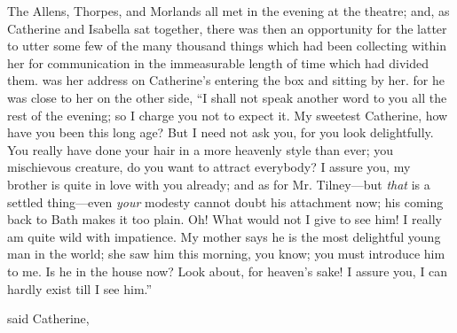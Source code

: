 The Allens, Thorpes, and Morlands all met in the evening at the theatre; and, as Catherine and Isabella sat together, there was then an opportunity for the latter to utter some few of the many thousand things which had been collecting within her for communication in the immeasurable length of time which had divided them.  was her address on Catherine's entering the box and sitting by her.  for he was close to her on the other side, “I shall not speak another word to you all the rest of the evening; so I charge you not to expect it. My sweetest Catherine, how have you been this long age? But I need not ask you, for you look delightfully. You really have done your hair in a more heavenly style than ever; you mischievous creature, do you want to attract everybody? I assure you, my brother is quite in love with you already; and as for Mr. Tilney---but {\em that} is a settled thing---even {\em your} modesty cannot doubt his attachment now; his coming back to Bath makes it too plain. Oh! What would not I give to see him! I really am quite wild with impatience. My mother says he is the most delightful young man in the world; she saw him this morning, you know; you must introduce him to me. Is he in the house now? Look about, for heaven's sake! I assure you, I can hardly exist till I see him.”

 said Catherine, 





